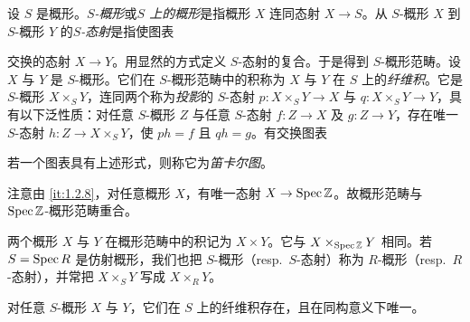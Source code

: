 设 $S$ 是概形。\emph{$S$-概形}或\emph{$S$ 上的概形}是指概形 $X$ 连同态射 $X\to S$。从 $S$-概形 $X$ 到 $S$-概形 $Y$ 的\emph{$S$-态射}是指使图表
\begin{center}
\end{center}
交换的态射 $X\to Y$。用显然的方式定义 $S$-态射的复合。于是得到 $S$-概形范畴。设 $X$ 与 $Y$ 是 $S$-概形。它们在 $S$-概形范畴中的积称为 $X$ 与 $Y$ 在 $S$ 上的\emph{纤维积}。它是 $S$-概形 $X\times_S Y$，连同两个称为\emph{投影}的 $S$-态射 $p\colon X\times_S Y\to X$ 与 $q\colon X\times_S Y\to Y$，具有以下泛性质：对任意 $S$-概形 $Z$ 与任意 $S$-态射 $f\colon Z\to X$ 及 $g\colon Z\to Y$，存在唯一 $S$-态射 $h\colon Z\to X\times_S Y$，使 $ph=f$ 且 $qh=g$。有交换图表
\begin{center}
\end{center}
若一个图表具有上述形式，则称它为\emph{笛卡尔图}。

注意由 \ref{it:1.2.8}，对任意概形 $X$，有唯一态射 $X\to \operatorname{Spec}\mathbb{Z}$。故概形范畴与 $\operatorname{Spec}\mathbb{Z}$-概形范畴重合。

两个概形 $X$ 与 $Y$ 在概形范畴中的积记为 $X\times Y$。它与 $X\times_{\operatorname{Spec}\mathbb{Z}}Y$ 相同。若 $S=\operatorname{Spec} R$ 是仿射概形，我们也把 $S$-概形（resp.\ $S$-态射）称为 $R$-概形（resp.\ $R$-态射），并常把 $X\times_S Y$ 写成 $X\times_R Y$。

\begin{proposition}\label{it:1.3.20}
对任意 $S$-概形 $X$ 与 $Y$，它们在 $S$ 上的纤维积存在，且在同构意义下唯一。
\end{proposition}

